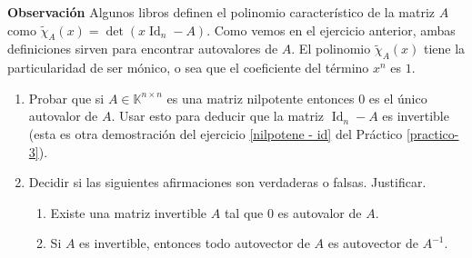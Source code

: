 \textbf{Observación} Algunos libros definen el polinomio característico de la matriz $A$ como $\tilde\chi_A(x)=\det(x\operatorname{Id}_n-A)$. Como vemos en el ejercicio anterior, ambas definiciones sirven para encontrar autovalores de $A$. El polinomio $\tilde\chi_A(x)$ tiene la particularidad de ser mónico, o sea que el coeficiente del término $x^n$ es $1$.

\begin{enumerate}[resume,topsep=6pt,itemsep=.4cm]

\item Probar que si $A\in\mathbb{K}^{n\times n}$ es una matriz nilpotente entonces $0$ es el único autovalor de $A$. Usar esto para deducir que la matriz $\operatorname{Id}_n-A$ es invertible (esta es otra demostración del ejercicio \ref{nilpotene - id} del Práctico \ref{practico-3}).


\item Decidir si las siguientes afirmaciones son verdaderas o falsas. Justificar.

\begin{enumerate}
    \item Existe una matriz invertible $A$ tal que $0$ es autovalor de $A$.
    \item  Si $A$ es invertible, entonces todo autovector de $A$ es autovector de $A^{-1}$.
\end{enumerate}




\end{enumerate}
